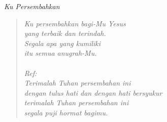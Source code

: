 \begin{center}
\itshape{Ku Persembahkan}
\end{center}

\small
\begin{verse}
\itshape{
Ku persembahkan bagi-Mu Yesus\\
yang terbaik dan terindah.\\
Segala apa yang kumiliki\\
itu semua anugrah-Mu.\\
{~}\\
Ref:\\
Terimalah Tuhan persembahan ini \\
dengan tulus hati dan dengan hati bersyukur\\ 
terimalah Tuhan persembahan ini\\ 
segala puji hormat bagimu.\\
}
\end{verse}
\normalsize

